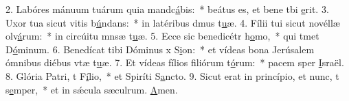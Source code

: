 2. Labóres mánuum tuárum quia mandc\uline{á}bis:~* beátus es, et bene tbi \uline{e}rit.
3. Uxor tua sicut vitis b\uline{ú}ndans:~* in latéribus dmus t\uline{u}æ.
4. Fílii tui sicut novéllæ olv\uline{á}rum:~* in circúitu mnsæ t\uline{u}æ.
5. Ecce sic benedicétr h\uline{o}mo,~* qui tmet D\uline{ó}minum.
6. Benedícat tibi Dóminus x S\uline{i}on:~* et vídeas bona Jerúsalem ómnibus diébus vtæ t\uline{u}æ.
7. Et vídeas fílios filiórum t\uline{ó}rum:~* pacem sper \uline{I}sraël.
8. Glória Patri, t F\uline{í}lio,~* et Spiríti S\uline{a}ncto.
9. Sicut erat in princípio, et nunc, t s\uline{e}mper,~* et in sǽcula sæculrum. \uline{A}men.
